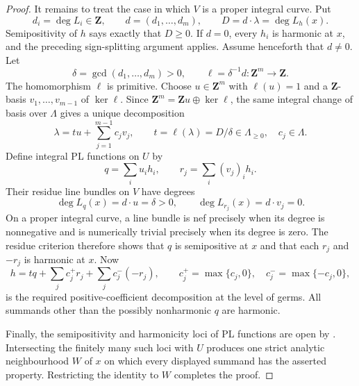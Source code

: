 \begin{proof}
It remains to treat the case in which $V$ is a proper integral curve.  Put
\[
                 d_i=\deg L_i\in\mathbf Z,\qquad
                 d=(d_1,\ldots,d_m),\qquad
                 D=d\cdot\lambda=\deg L_h(x).
\]
Semipositivity of $h$ says exactly that $D\geq0$.  If $d=0$, every $h_i$
is harmonic at $x$, and the preceding sign-splitting argument applies.
Assume henceforth that $d\ne0$.  Let
\[
                 \delta=\gcd(d_1,\ldots,d_m)>0,
                 \qquad \ell=\delta^{-1}d:\mathbf Z^m\to\mathbf Z.
\]
The homomorphism $\ell$ is primitive.  Choose $u\in\mathbf Z^m$ with
$\ell(u)=1$ and a $\mathbf Z$-basis
$v_1,\ldots,v_{m-1}$ of $\ker\ell$.  Since
$\mathbf Z^m=\mathbf Zu\oplus\ker\ell$, the same integral change of basis
over $\Lambda$ gives a unique decomposition
\[
            \lambda=t u+\sum_{j=1}^{m-1}c_jv_j,
            \qquad
            t=\ell(\lambda)=D/\delta\in\Lambda_{\geq0},
            \quad c_j\in\Lambda.
\]
Define integral PL functions on $U$ by
\[
                    q=\sum_i u_i h_i,
             \qquad r_j=\sum_i(v_j)_i h_i.
\]
Their residue line bundles on $V$ have degrees
\[
              \deg L_q(x)=d\cdot u=\delta>0,
              \qquad \deg L_{r_j}(x)=d\cdot v_j=0.
\]
On a proper integral curve, a line bundle is nef precisely when its degree
is nonnegative and is numerically trivial precisely when its degree is zero.
The residue criterion \cite[Proposition~7.1]{GJR26} therefore shows that
$q$ is semipositive at $x$ and that each $r_j$ and $-r_j$ is harmonic at
$x$.  Now
\[
 h=tq+\sum_j c_j^+r_j+\sum_j c_j^-(-r_j),
 \qquad
 c_j^+=\max\{c_j,0\},\quad c_j^-=\max\{-c_j,0\},
\]
is the required positive-coefficient decomposition at the level of germs.
All summands other than the possibly nonharmonic $q$ are harmonic.

Finally, the semipositivity and harmonicity loci of PL functions are open
by \cite[Remark~7.3(4)]{GJR26}.  Intersecting the finitely many such loci
with $U$ produces one strict analytic neighbourhood $W$ of $x$ on which
every displayed summand has the asserted property.  Restricting the identity
to $W$ completes the proof.
\end{proof}
